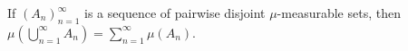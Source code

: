 If $(A_n)_{n=1}^{\infty}$ is a sequence of pairwise disjoint $\mu$-measurable sets, then $\mu(\bigcup_{n=1}^{\infty} A_n) = \sum_{n=1}^{\infty} \mu(A_n)$.
